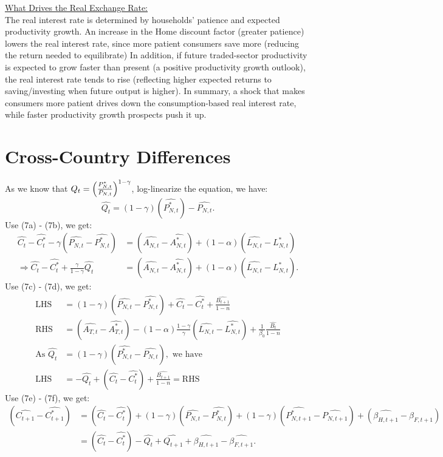 \documentclass[a4paper,12pt]{article} %
\theoremstyle{nonitalic}
\begin{document}
\underline{What Drives the Real Exchange Rate:} \\
The real interest rate is determined by households' patience and expected productivity growth. 
An increase in the Home discount factor (greater patience) lowers the real interest rate, 
since more patient consumers save more (reducing the return needed to equilibrate)
In addition, if future traded-sector productivity is expected to grow faster than present 
(a positive productivity growth outlook), 
the real interest rate tends to rise (reflecting higher expected returns to saving/investing when future output is higher). 
In summary, a shock that makes consumers more patient drives down the consumption-based real interest rate, 
while faster productivity growth prospects push it up.

\section{Cross-Country Differences}
As we know that $Q_t = \Bigl(\frac{P_{N,t}^*}{P_{N,t}}\Bigr)^{1-\gamma}$, log-linearize the equation, we have:
\[\widehat{Q_t} = (1-\gamma)(\widehat{P_{N,t}^*}) - \widehat{P_{N,t}}.\]
Use (7a) - (7b), we get:
\begin{align*}
    \widehat{C_t} - \widehat{C_t^*} - \gamma(\widehat{P_{N,t}} - \widehat{P_{N,t}^*}) &= (\widehat{A_{N,t}} - \widehat{A_{N,t}^*}) + (1-\alpha)(\widehat{L_{N,t}} - \widehat{L_{N,t}^*}) \\
    \Rightarrow \widehat{C_t} - \widehat{C_t^*} + \frac{\gamma}{1-\gamma}\widehat{Q_t} &= (\widehat{A_{N,t}} - \widehat{A_{N,t}^*}) + (1-\alpha)(\widehat{L_{N,t}} - \widehat{L_{N,t}^*}) \tag{9a}.
\end{align*}
Use (7c) - (7d), we get:
\begin{align*}
    \text{LHS} &= (1-\gamma)(\widehat{P_{N,t}} - \widehat{P_{N,t}^*}) + \widehat{C_t} - \widehat{C_t^*} + \frac{\widehat{B_{t+1}}}{1-n} \\
    \text{RHS} &= (\widehat{A_{T,t}} - \widehat{A_{T,t}^*}) - (1-\alpha)\frac{1-\gamma}{\gamma}(\widehat{L_{N,t}} - \widehat{L_{N,t}^*}) + \frac{1}{\beta_0} \frac{\widehat{B_t}}{1-n} \\
    \text{As } \widehat{Q_t} &= (1-\gamma)(\widehat{P_{N,t}^*} - \widehat{P_{N,t}}), \text{ we have} \\ 
    \text{LHS} &= - \widehat{Q_t} + (\widehat{C_t} - \widehat{C_t^*}) + \frac{\widehat{B_{t+1}}}{1-n} = \text{RHS} \tag{9b}
\end{align*}
Use (7e) - (7f), we get:
\begin{align*}
    (\widehat{C_{t+1}} - \widehat{C_{t+1}^*}) &= (\widehat{C_t} - \widehat{C_t^*}) + (1-\gamma)(\widehat{P_{N,t}} - \widehat{P_{N,t}^*}) + (1-\gamma)(\widehat{P_{N,t+1}^*} - \widehat{P_{N,t+1}}) + (\widehat{\beta_{H, t+1}} - \widehat{\beta_{F, t+1}}) \\
    &= (\widehat{C_t} - \widehat{C_t^*}) - \widehat{Q_t} + \widehat{Q_{t+1}} + \widehat{\beta_{H, t+1}} - \widehat{\beta_{F, t+1}} \tag{9c}.
\end{align*}
\end{document}
